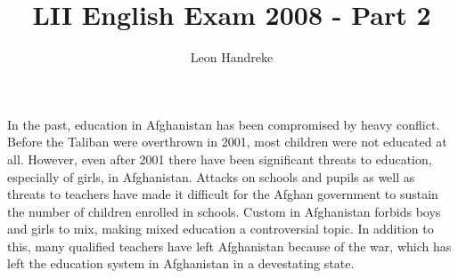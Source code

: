 \documentclass[11pt]{article}
\title{LII English Exam 2008 - Part 2}
\author{Leon Handreke}
\date{}                                           %
\begin{document}
\doublespacing

\maketitle
{}\selectfont

In the past, education in Afghanistan has been compromised by heavy conflict. Before the Taliban were overthrown in 2001, most children were not educated at all. However, even after 2001 there have been significant threats to education, especially of girls, in Afghanistan. Attacks on schools and pupils as well as threats to teachers have made it difficult for the Afghan government to sustain the number of children enrolled in schools. Custom in Afghanistan forbids boys and girls to mix, making mixed education a controversial topic. In addition to this, many qualified teachers have left Afghanistan because of the war, which has left the education system in Afghanistan in a devestating state.
\end{document}
